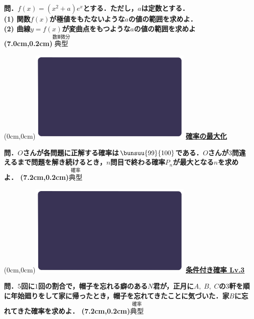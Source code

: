 \documentclass[10pt,
fleqn,
dvipdfmx,
uplatex
]{jsarticle}
\begin{document}
\normalsize 
\bf\boldmath 問．$f\left(x\right)=\left(x^2+a\right)e^x$とする．ただし，$a$は定数とする．\\
(1)  関数$f\left(x\right)$が極値をもたないような$a$の値の範囲を求めよ．\\
(2)  曲線$y=f\left(x\right)$が変曲点をもつような$a$の値の範囲を求めよ\\

\at(7.0cm,0.2cm){\small\color{bradorange}$\overset{\text{数Ⅲ微分}}{\text{典型}}$}


\newpage



\at(0cm,0cm){\includegraphics[width=8cm,bb=0 0 1920 1080]{./youtube/thumbnails/templates/smart_background/確率.jpeg}}
{\color{orange}\bf\boldmath\huge\underline{確率の最大化}}\vspace{0.3zw}

\Large 
\bf\boldmath 問．$O$さんが各問題に正解する確率は$\bunsuu{{99}}{{100}}$である．$O$さんが$3$問違えるまで問題を解き続けるとき，$n$問目で終わる確率$P_n$が最大となる$n$を求めよ．
\at(7.2cm,0.2cm){\small\color{bradorange}$\overset{\text{確率}}{\text{典型}}$}


\newpage



\at(0cm,0cm){\includegraphics[width=8cm,bb=0 0 1920 1080]{./youtube/thumbnails/templates/smart_background/確率.jpeg}}
{\color{orange}\bf\boldmath\huge\underline{条件付き確率 Lv.3 }}\vspace{0.3zw}

\large 
\bf\boldmath 問．$5$回に$1$回の割合で，帽子を忘れる癖のある$N$君が，正月に$A,\;B,\;C$の$3$軒を順に年始廻りをして家に帰ったとき，帽子を忘れてきたことに気づいた．家$B$に忘れてきた確率を求めよ．
\at(7.2cm,0.2cm){\small\color{bradorange}$\overset{\text{確率}}{\text{典型}}$}
\end{document}
